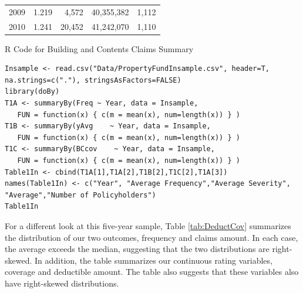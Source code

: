 \documentclass[]{book}
\theoremstyle{definition}
\theoremstyle{definition}
\theoremstyle{definition}
\theoremstyle{remark}
\begin{document}
\begin{longtable}[]{@{}lrrrr@{}}
\begin{minipage}[t]{0.25\columnwidth}
2009\strut
\end{minipage} & \begin{minipage}[t]{0.14\columnwidth}\raggedleft\strut
1.219\strut
\end{minipage} & \begin{minipage}[t]{0.13\columnwidth}\raggedleft\strut
4,572\strut
\end{minipage} & \begin{minipage}[t]{0.15\columnwidth}\raggedleft\strut
40,355,382\strut
\end{minipage} & \begin{minipage}[t]{0.17\columnwidth}\raggedleft\strut
1,112\strut
\end{minipage}\tabularnewline
\begin{minipage}[t]{0.25\columnwidth}\raggedright\strut
2010\strut
\end{minipage} & \begin{minipage}[t]{0.14\columnwidth}\raggedleft\strut
1.241\strut
\end{minipage} & \begin{minipage}[t]{0.13\columnwidth}\raggedleft\strut
20,452\strut
\end{minipage} & \begin{minipage}[t]{0.15\columnwidth}\raggedleft\strut
41,242,070\strut
\end{minipage} & \begin{minipage}[t]{0.17\columnwidth}\raggedleft\strut
1,110\strut
\end{minipage}\tabularnewline
\bottomrule
\end{longtable}

R Code for Building and Contents Claims Summary

\hypertarget{display.CoverageBC.2}{}
\begin{verbatim}
Insample <- read.csv("Data/PropertyFundInsample.csv", header=T, na.strings=c("."), stringsAsFactors=FALSE)
library(doBy)
T1A <- summaryBy(Freq ~ Year, data = Insample, 
   FUN = function(x) { c(m = mean(x), num=length(x)) } )
T1B <- summaryBy(yAvg    ~ Year, data = Insample,   
   FUN = function(x) { c(m = mean(x), num=length(x)) } )
T1C <- summaryBy(BCcov    ~ Year, data = Insample,   
   FUN = function(x) { c(m = mean(x), num=length(x)) } )
Table1In <- cbind(T1A[1],T1A[2],T1B[2],T1C[2],T1A[3])
names(Table1In) <- c("Year", "Average Frequency","Average Severity", "Average","Number of Policyholders")
Table1In
\end{verbatim}

For a different look at this five-year sample, Table \ref{tab:DeductCov}
summarizes the distribution of our two outcomes, frequency and claims
amount. In each case, the average exceeds the median, suggesting that
the two distributions are right-skewed. In addition, the table
summarizes our continuous rating variables, coverage and deductible
amount. The table also suggests that these variables also have
right-skewed distributions.
\end{document}
